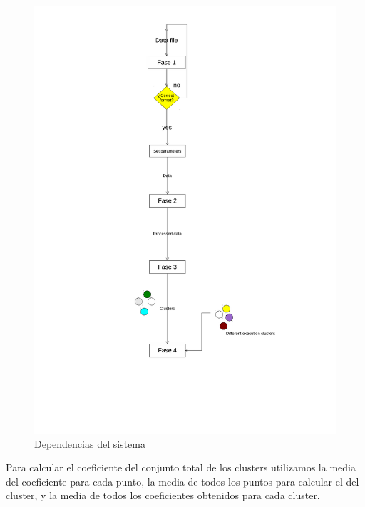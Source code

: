 \documentclass[10pt,a4paper]{article}
\begin{document}
\begin{figure}[H]
	\centering
	\includegraphics[scale=0.80]{./img/dependenciasKmeans.pdf}%
	\caption[Esquema de dependencias del sistema]{Dependencias del sistema}
	\label{fig:dependencias}
\end{figure}

Para calcular el coeficiente del conjunto total de los clusters utilizamos la media del coeficiente para cada punto, la media de todos los puntos para calcular el del cluster, y la media de todos los coeficientes obtenidos para cada cluster.

\newpage

\end{document}
